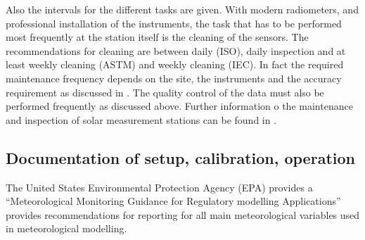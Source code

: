     Also the intervals for the different tasks are given. With modern radiometers, and professional installation of the instruments, the task that has to be performed most frequently at the station itself is the cleaning of the sensors. The recommendations for cleaning are between daily (ISO), daily inspection and at least weekly cleaning (ASTM) and weekly cleaning (IEC). In fact the required maintenance frequency depends on the site, the instruments and the accuracy requirement as discussed in \cite{nrelhandbook2021}.  The quality control of the data must also be performed frequently as discussed above. Further information o the maintenance and inspection of solar measurement stations can be found in \cite{nrelhandbook2021}.




\subsection{Documentation of setup, calibration, operation}\label{sec:logging-of-calibration}
{\color{blue}{Comment from SW (25.06.2021:  separate subsection seems too much.}}

The United States Environmental Protection Agency (EPA) provides a “Meteorological Monitoring Guidance for Regulatory modelling Applications” \cite{EPA2000} provides recommendations for  reporting for all main meteorological variables used in meteorological modelling.


